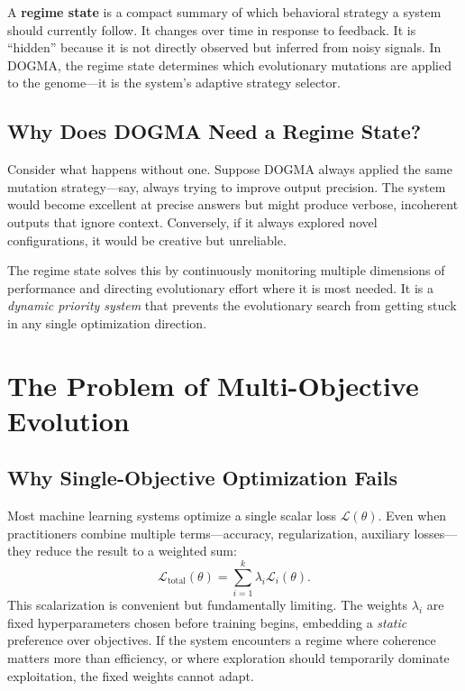 \begin{keyinsight}
A \textbf{regime state} is a compact summary of which behavioral strategy a system should currently follow. It changes over time in response to feedback. It is ``hidden'' because it is not directly observed but inferred from noisy signals. In DOGMA, the regime state determines which evolutionary mutations are applied to the genome---it is the system's adaptive strategy selector.
\end{keyinsight}

\subsection{Why Does DOGMA Need a Regime State?}

Consider what happens without one. Suppose DOGMA always applied the same mutation strategy---say, always trying to improve output precision. The system would become excellent at precise answers but might produce verbose, incoherent outputs that ignore context. Conversely, if it always explored novel configurations, it would be creative but unreliable.

The regime state solves this by continuously monitoring multiple dimensions of performance and directing evolutionary effort where it is most needed. It is a \emph{dynamic priority system} that prevents the evolutionary search from getting stuck in any single optimization direction.

\section{The Problem of Multi-Objective Evolution}
\label{sec:multi-objective}

\subsection{Why Single-Objective Optimization Fails}

Most machine learning systems optimize a single scalar loss $\mathcal{L}(\theta)$. Even when practitioners combine multiple terms---accuracy, regularization, auxiliary losses---they reduce the result to a weighted sum:
\begin{equation}
\mathcal{L}_{\text{total}}(\theta) = \sum_{i=1}^{k} \lambda_i \mathcal{L}_i(\theta).
\label{eq:scalar-loss}
\end{equation}
This scalarization is convenient but fundamentally limiting. The weights $\lambda_i$ are fixed hyperparameters chosen before training begins, embedding a \emph{static} preference over objectives. If the system encounters a regime where coherence matters more than efficiency, or where exploration should temporarily dominate exploitation, the fixed weights cannot adapt.

